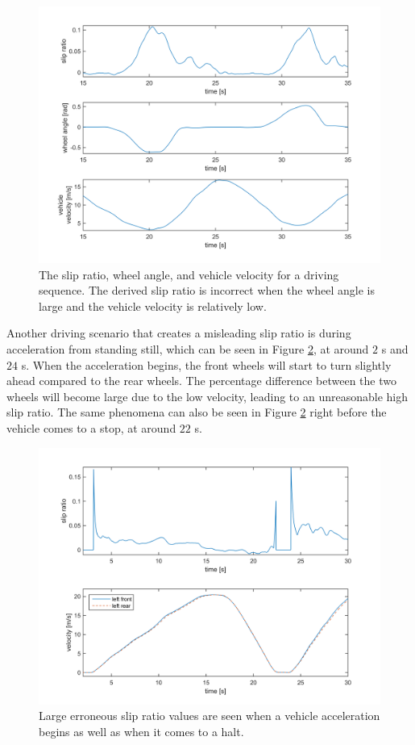 \begin{figure}[h]
	\centering
	\includegraphics[width=1.0\textwidth]{Pictures/turning_slow_Vx}
	\caption {The slip ratio, wheel angle, and vehicle velocity for a driving sequence. The derived slip ratio is incorrect when the wheel angle is large and the vehicle velocity is relatively low.}
	\label{turning_slow_Vx}
\end{figure}

Another driving scenario that creates a misleading slip ratio is during acceleration from standing still, which can be seen in Figure \ref{slipratio_from_still}, at around $ 2 $ s and $ 24 $ s. When the acceleration begins, the front wheels will start to turn slightly ahead compared to the rear wheels. The percentage difference between the two wheels will become large due to the low velocity, leading to an unreasonable high slip ratio. The same phenomena can also be seen in Figure \ref{slipratio_from_still} right before the vehicle comes to a stop, at around $ 22 $ s. 

\begin{figure}[h]
	\centering
	\includegraphics[width=1.0\textwidth]{Pictures/slipratio_from_still}
	\caption {Large erroneous slip ratio values are seen when a vehicle acceleration begins as well as when it comes to a halt.}
	\label{slipratio_from_still}
\end{figure}


